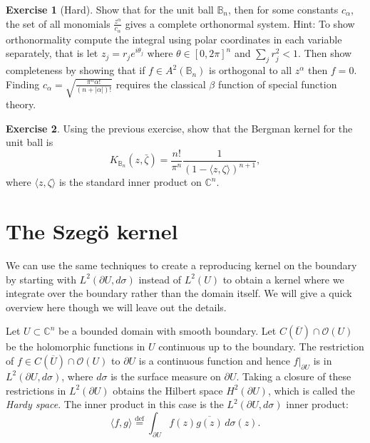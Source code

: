\documentclass[12pt,openany]{book}
\newcommand{\linnprod}[2]{\langle #1 , #2 \rangle}
\newcommand{\abs}[1]{\left\lvert {#1} \right\rvert}
\newcommand{\C}{{\mathbb{C}}}
\newcommand{\bB}{{\mathbb{B}}}
\newcommand{\sO}{{\mathscr{O}}}
\newcommand{\myindex}[1]{#1\index{#1}}
\theoremstyle{plain}
\theoremstyle{remark}
\theoremstyle{definition}
\newenvironment{exbox}{%
    \def\FrameCommand{\vrule width 1pt \relax\hspace {10pt}}%
    \MakeFramed {\advance \hsize -\width \FrameRestore }%
}{%
    \endMakeFramed
}
\theoremstyle{exercise}
\newtheorem{exercise}{Exercise}[section]
\theoremstyle{example}
\begin{document}
\begin{exbox}
\begin{exercise}[Hard]
Show that for the unit ball $\bB_n$, then for some constants $c_\alpha$,
the set of all monomials $\frac{z^\alpha}{c_\alpha}$ gives a complete orthonormal
system.  Hint: To show orthonormality
compute the integral using polar coordinates in each variable
separately, that is let $z_j = r_j e^{i\theta_j}$ where $\theta \in
[0,2\pi]^n$ and $\sum_j r_j^2 < 1$.  Then show completeness by showing that
if $f \in A^2(\bB_n)$ is orthogonal to all $z^\alpha$ then $f = 0$.
Finding $c_\alpha = \sqrt{\frac{\pi^n \alpha!}{(n+\abs{\alpha})!}}$ requires
the classical $\beta$ function of special function theory.
\end{exercise}

\begin{exercise}
Using the previous exercise, show that the Bergman kernel for the unit ball
is
\begin{equation*}
K_{\bB_n}(z,\bar{\zeta}) =
\frac{n!}{\pi^n}\frac{1}{{(1-\linnprod{z}{\zeta})}^{n+1}},
\end{equation*}
where $\linnprod{z}{\zeta}$ is the standard inner product on $\C^n$.
\end{exercise}
\end{exbox}


\section{The Szeg{\"o} kernel}

We can use the same techniques to create a reproducing kernel on the
boundary by starting with $L^2(\partial U, d\sigma)$ instead of $L^2(U)$ to obtain a
kernel where we integrate over the boundary rather than the domain itself.
We will give a quick overview here though we will leave out the details.

Let $U \subset \C^n$ be a bounded domain with smooth boundary.  Let
$C(\overline{U}) \cap \sO(U)$ be the holomorphic functions in $U$
continuous up to the boundary.  The restriction of
$f \in C(\overline{U}) \cap \sO(U)$ to $\partial U$ is a continuous function
and hence $f|_{\partial U}$ is in $L^2(\partial U,d\sigma)$, where $d\sigma$
is the surface measure on $\partial U$.  Taking a closure
of these restrictions in $L^2(\partial U)$ obtains the Hilbert space
$H^2(\partial U)$,
%
which is called the \emph{\myindex{Hardy space}}.
The inner product in this case is the $L^2(\partial U,
d\sigma)$ inner product:
\begin{equation*}
\linnprod{f}{g} \overset{\text{def}}{=} \int_{\partial U} f(z)
\overline{g(z)} \, d\sigma(z) .
\end{equation*}
\end{document}
